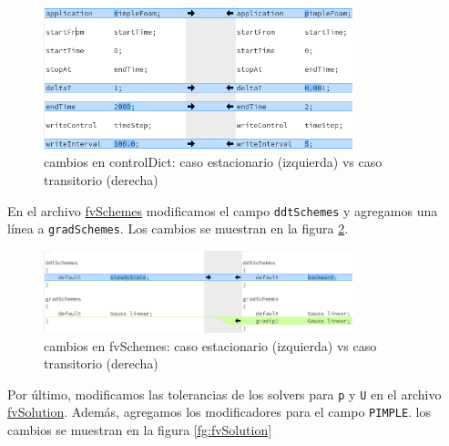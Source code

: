 \documentclass[oneside,a4paper,spanish,links]{amca}
\begin{document}
\begin{figure}[htb]
	\centerline{\includegraphics[width=0.8\textwidth]{Figuras/02_controlDict_1.png}}
	\caption{cambios en controlDict: caso estacionario (izquierda) vs caso transitorio (derecha)} \label{fg:controlDict}
\end{figure}

En el archivo \href{https://github.com/guillerolle/casos_cfd/tree/master/04/case/system/fvSchemes}{fvSchemes} modificamos el campo \texttt{ddtSchemes} y agregamos una línea a \texttt{gradSchemes}. Los cambios se muestran en la figura \ref{fg:fvSchemes}.

\begin{figure}[htb]
	\centerline{\includegraphics[width=0.8\textwidth]{Figuras/02_fvSchemes_1.png}} 
	\caption{cambios en fvSchemes: caso estacionario (izquierda) vs caso transitorio (derecha)} \label{fg:fvSchemes}
\end{figure}

\newpage

Por último, modificamos las tolerancias de los solvers para \texttt{p} y \texttt{U} en el archivo \href{https://github.com/guillerolle/casos_cfd/tree/master/04/case/system/fvSolution}{fvSolution}. Además, agregamos los modificadores para el campo \texttt{PIMPLE}. los cambios se muestran en la figura \ref{fg:fvSolution}
\end{document}
